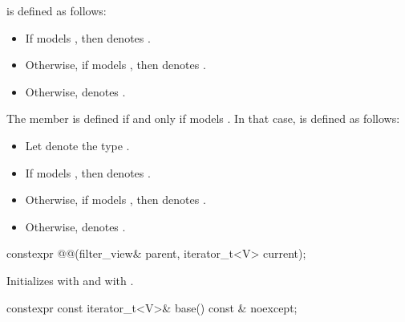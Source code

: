 \pnum
{} is defined as follows:
\begin{itemize}
\item If  models , then
 denotes .

\item Otherwise, if  models , then
 denotes .

\item Otherwise,  denotes .
\end{itemize}

\pnum
The member   is defined
if and only if  models .
In that case,
 is defined as follows:
\begin{itemize}
\item Let  denote the type
.

\item If  models
,
then  denotes .

\item Otherwise, if   models
,
then  denotes .

\item Otherwise,  denotes .
\end{itemize}

%
\begin{itemdecl}
constexpr @@(filter_view& parent, iterator_t<V> current);
\end{itemdecl}

\begin{itemdescr}
\pnum
\effects
Initializes  with  and
 with .
\end{itemdescr}

%
\begin{itemdecl}
constexpr const iterator_t<V>& base() const & noexcept;
\end{itemdecl}

